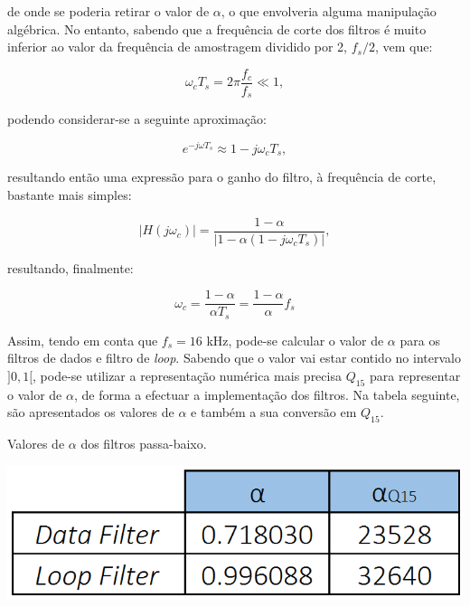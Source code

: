 \documentclass[11pt]{article}
\numberwithin{equation}{section}
\begin{document}
{\vspace{1mm}
de onde se poderia retirar o valor de $\alpha$, o que envolveria alguma manipulação algébrica. No entanto, sabendo que a frequência de corte dos filtros é muito inferior ao valor da frequência de amostragem dividido por 2, $f_s/2$, vem que:

\vspace{-3mm}
\begin{equation}
\omega_ c T_s = 2\pi \frac{f_c}{f_s} \ll 1,
\end{equation} 

\vspace{1mm}
podendo considerar-se a seguinte aproximação:

\vspace{-3mm}
\begin{equation}
e^{-j\omega T_s} \approx 1 - j\omega_c T_s,
\end{equation} 

\vspace{1mm}
resultando então uma expressão para o ganho do filtro, à frequência de corte, bastante mais simples:

\vspace{-3mm}
\begin{equation}
|H(j\omega_c)| =  \frac{1 - \alpha}{|1-\alpha(1-j\omega_c T_s)|},
\end{equation} 

\vspace{1mm}
resultando, finalmente:

\vspace{-3mm}
\begin{equation}
\omega_c = \frac{1 - \alpha}{\alpha T_s} = \frac{1 - \alpha}{\alpha} f_s
\label{eq:alfa}
\end{equation} 

\vspace{1mm}
Assim, tendo em conta que $f_s = 16$ kHz, pode-se calcular o valor de $\alpha$ para os filtros de dados e filtro de \textit{loop}. Sabendo que o valor vai estar contido no intervalo $]0,1[$, pode-se utilizar a representação numérica mais precisa $Q_{15}$ para representar o valor de $\alpha$, de forma a efectuar a implementação dos filtros. Na tabela seguinte, são apresentados os valores de $\alpha$ e também a sua conversão em $Q_{15}$.

\begin{table}[H]
	\centering
	\caption{Valores de $\alpha$ dos filtros passa-baixo.}
	\vspace{-1.5mm}
	\includegraphics[keepaspectratio=true, scale=0.35]{tabelas/alphas}
\end{table}

}
\end{document}

